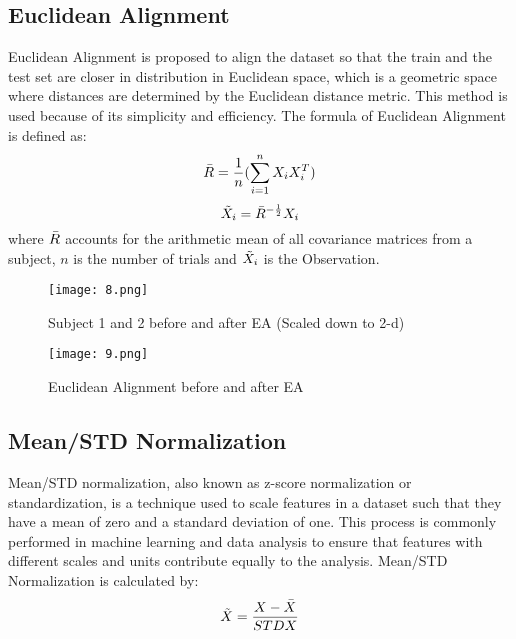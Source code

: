 \documentclass[]{report}
\begin{document}
\subsection{Euclidean Alignment}
Euclidean Alignment\cite{he2020} is proposed to align the dataset so that the train and the test set are closer in distribution in Euclidean space, which is a geometric space where distances are determined by the Euclidean distance metric. This method is used because of its simplicity and efficiency. The formula of Euclidean Alignment is defined as: 
\begin{equation}
    \Bar{R} =  \frac{1}{n}(\sum_{i=1}^{n} X_i X_i^T) 
\end{equation}
\begin{equation}
    \Tilde{X}_i = \Bar{R}^{-\frac{1}{2}}X_i
\end{equation}
where $\Bar{R}$ accounts for the arithmetic mean of all covariance matrices from a subject, $n$ is the number of trials and $\Tilde{X}_i$ is the Observation. 
\begin{figure}[H]
    \centering
    \texttt{[image: 8.png]}
    \caption{Subject 1 and 2 before and after EA (Scaled down to 2-d)}
    \label{fig:enter-label}
\end{figure}
\begin{figure}[H]
    \centering
    \texttt{[image: 9.png]}
    \caption{Euclidean Alignment before and after EA}
    \label{fig:enter-label}
\end{figure}
\subsection{Mean/STD Normalization}
Mean/STD normalization, also known as z-score normalization or standardization, is a technique used to scale features in a dataset such that they have a mean of zero and a standard deviation of one. This process is commonly performed in machine learning and data analysis to ensure that features with different scales and units contribute equally to the analysis. Mean/STD Normalization is calculated by:
\begin{equation}
    \Tilde{X} = \frac{X - \Bar{X}}{STD{X}}
\end{equation}
\end{document}

